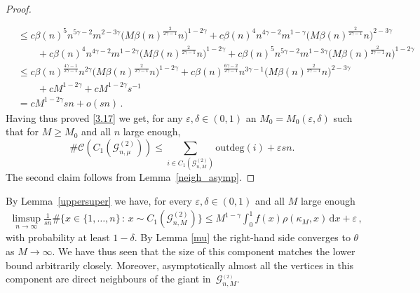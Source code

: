 \documentclass[12pt,a4paper]{article}
\numberwithin{equation}{section}
\begin{document}
\begin{proof}
\begin{align*}
      \end{align*}
      \begin{align*}
    \\ &\le   c \beta(n)^{5}n^{5\gamma-2}
    m^{2-3\gamma} 
    \big(M  \beta(n)^{\tfrac{2}{2\gamma-1}}n\big)^{1-2\gamma} + c \beta(n)^4 n^{4\gamma-2} m^{1-\gamma } \big(M  \beta(n)^{\tfrac{2}{2\gamma-1}}n\big)^{2-3\gamma} 
    \\ & \qquad + c\beta(n)^4 n^{4\gamma-2}m^{1-2\gamma} \big(M  \beta(n)^{\tfrac{2}{2\gamma-1}}n\big)^{1-2\gamma} + c \beta(n)^{5}n^{5\gamma-2}
    m^{1-3\gamma} 
    \big(M  \beta(n)^{\tfrac{2}{2\gamma-1}}n\big)^{1-2\gamma}
    \\  & \le c\beta(n)^{\tfrac{4\gamma-1}{2\gamma-1}}n^{2\gamma}\big(M  \beta(n)^{\tfrac{2}{2\gamma-1}}n\big)^{1-2\gamma} + c \beta(n)^{\tfrac{6\gamma-2}{2\gamma-1}}n^{3\gamma-1}\big(M  \beta(n)^{\tfrac{2}{2\gamma-1}}n\big)^{2-3\gamma} 
    \\ &  \qquad + c M^{1-2\gamma}+ c M^{1-2\gamma} s^{-1}
    \\ &=cM^{1-2\gamma}sn + o(sn)\,.
\end{align*}
Having thus proved \eqref{3.17} we get, for any $\varepsilon,\delta\in(0,1)$ an $M_0=M_0(\varepsilon,\delta)$ such that for $M\ge M_0$ and all $n$ large enough,
$$\#\mathcal C(C_1(\mathcal G^{(2)}_{n, \mu})) \le  \sum_{i\in C_1(\mathcal G^{(2)}_{n,M})} \text{outdeg}(i) + \varepsilon sn .$$
The second claim follows from Lemma~\ref{neigh_asymp}.
\end{proof}

By Lemma~\ref{uppersuper} we have, for every  $\varepsilon,\delta\in(0,1)$ and all $M$ large enough
\begin{align*}
     \limsup_{n\to\infty} \frac{1}{sn}\#\big\{x\in\{1,\dots,n\}\,:\, x \sim C_1(\mathcal G_{n,M}^{(2)}) \}  
     \leq
     M^{1-\gamma} \int_0^1 f(x) \rho(\kappa_M , x)\,\text{d}x
     +\varepsilon\,,
\end{align*} 
with probability at least $1-\delta$. By Lemma \ref{mu} the right-hand side converges to $\theta$ as $M\to\infty$. We have thus seen that the size of this component matches the lower bound arbitrarily closely. Moreover, asymptotically almost all the vertices in this component are direct neighbours of the giant in~$\mathcal G_{n,M}^{_{(2)}}$. \smallskip
\end{document}
